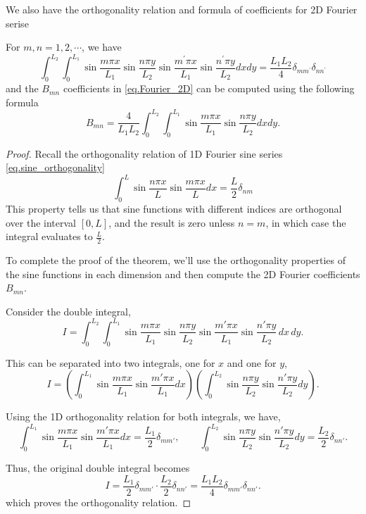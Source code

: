 We also have the orthogonality relation and formula of coefficients for 2D Fourier serise 
\begin{theorem} For $m, n=1,2, \cdots$, we have
    $$
    \int_0^{L_2} \int_0^{L_1} \sin \frac{m \pi x}{L_1} \sin \frac{n \pi y}{L_2} \sin \frac{m^{\prime} \pi x}{L_1} \sin \frac{n^{\prime} \pi y}{L_2} d x d y=\frac{L_1 L_2}{4} \delta_{m m^{\prime}} \delta_{n n^{\prime}}
    $$
and the $B_{mn}$ coefficients in \eqref{eq.Fourier_2D} can be computed using the following formula
\begin{equation}\label{eq.coef_formula_2D_Fourier}
    B_{mn} = \frac{4}{L_1L_2}\int_0^{L_2} \int_0^{L_1} \sin \frac{m \pi x}{L_1} \sin \frac{n \pi y}{L_2} d x d y.
\end{equation}
\end{theorem}
\begin{proof}
Recall the orthogonality relation of 1D Fourier sine series \eqref{eq.sine_orthogonality}
$$
\int_0^L \sin \frac{n \pi x}{L} \sin \frac{m \pi x}{L} d x=\frac{L}{2} \delta_{n m}
$$
This property tells us that sine functions with different indices are orthogonal over the interval $[0, L]$, and the result is zero unless $n = m$, in which case the integral evaluates to $\frac{L}{2}$.

To complete the proof of the theorem, we'll use the orthogonality properties of the sine functions in each dimension and then compute the 2D Fourier coefficients $B_{mn}$.

Consider the double integral,
\[
I = \int_0^{L_2} \int_0^{L_1} \sin \frac{m \pi x}{L_1} \sin \frac{n \pi y}{L_2} \sin \frac{m' \pi x}{L_1} \sin \frac{n' \pi y}{L_2} \, dx \, dy.
\]

This can be separated into two integrals, one for $x$ and one for $y$,
\[
I = \left( \int_0^{L_1} \sin \frac{m \pi x}{L_1} \sin \frac{m' \pi x}{L_1} dx \right) \left( \int_0^{L_2} \sin \frac{n \pi y}{L_2} \sin \frac{n' \pi y}{L_2} dy \right).
\]

Using the 1D orthogonality relation for both integrals, we have,
\[
\int_0^{L_1} \sin \frac{m \pi x}{L_1} \sin \frac{m' \pi x}{L_1} dx = \frac{L_1}{2} \delta_{m m'},\qquad \int_0^{L_2} \sin \frac{n \pi y}{L_2} \sin \frac{n' \pi y}{L_2} dy = \frac{L_2}{2} \delta_{n n'}.
\]

Thus, the original double integral becomes
\[
I = \frac{L_1}{2} \delta_{m m'} \cdot \frac{L_2}{2} \delta_{n n'} = \frac{L_1 L_2}{4} \delta_{m m'} \delta_{n n'}.
\]
which proves the orthogonality relation.


\end{proof}
